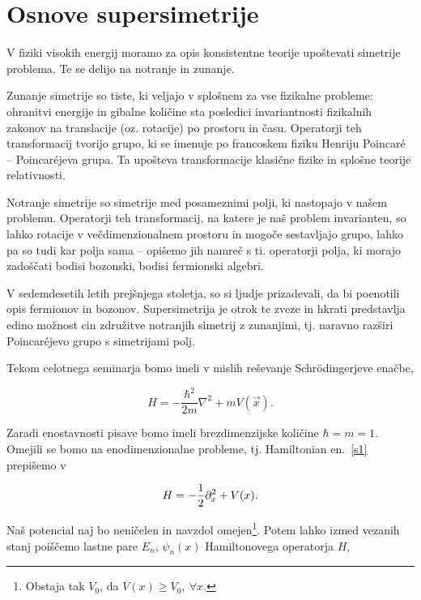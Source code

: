 \section{Osnove supersimetrije}

V fiziki visokih energij moramo za opis konsistentne teorije upo\v stevati simetrije problema. Te se delijo
na notranje in zunanje.

Zunanje simetrije so tiste, ki veljajo v splo\v snem za vse fizikalne probleme: ohranitvi
energije in gibalne koli\v cine sta posledici invariantnosti fizikalnih zakonov na translacije (oz. rotacije) po
prostoru in \v casu. Operatorji teh transformacij tvorijo grupo, ki se imenuje po francoskem fiziku Henriju Poincaré
-- Poincaréjeva grupa. Ta upo\v steva transformacije klasi\v cne fizike in splo\v sne teorije relativnosti.

Notranje simetrije so simetrije med posameznimi polji, ki nastopajo v na\v sem problemu.
Operatorji teh transformacij, na katere je na\v s problem invarianten, so lahko rotacije v ve\v cdimenzionalnem
prostoru in mogo\v ce sestavljajo grupo, lahko pa so tudi kar polja sama -- opi\v semo jih
namre\v c s ti. operatorji polja, ki morajo zado\v s\v cati bodisi bozonski, bodisi fermionski algebri.

V sedemdesetih letih prej\v snjega stoletja, so si ljudje prizadevali, da bi poenotili opis fermionov in bozonov.
Supersimetrija je otrok te zveze in hkrati predstavlja edino mo\v znost cin zdru\v zitve notranjih simetrij z
zunanjimi, tj. naravno raz\v siri Poincaréjevo grupo s simetrijami polj.

Tekom celotnega seminarja bomo imeli v mislih re\v sevanje Schr\" odingerjeve ena\v cbe,

\begin{equation}
	H = -\frac{\hbar^2}{2m}\nabla^2 + mV(\vec{x}).
	\label{s1}
\end{equation}

\ni Zaradi enostavnosti pisave bomo imeli brezdimenzijske koli\v cine $\hbar = m = 1$.
Omejili se bomo na enodimenzionalne probleme, tj. Hamiltonian en.~\eqref{s1} prepi\v semo v

\begin{equation}
	H = -\frac{1}{2}\partial_x^2 + V(x).
	\label{sx}
\end{equation}

\ni Na\v s potencial naj bo neni\v celen in navzdol omejen\footnote{Obstaja tak $V_0$, da $V(x) \geq V_0,\ \forall x$.}. Potem
lahko izmed vezanih stanj poi\v s\v cemo lastne pare $E_n$, $\psi_n (x)$ Hamiltonovega operatorja $H$,


